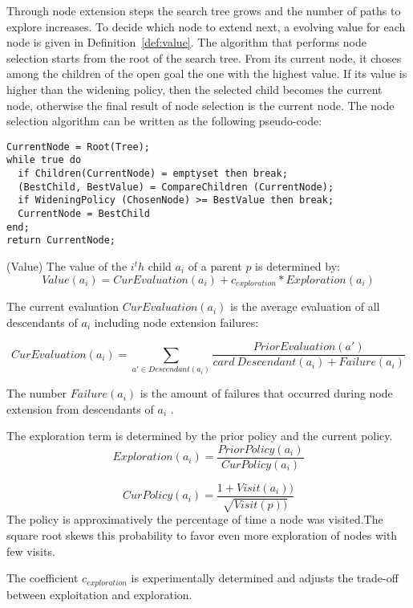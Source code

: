 \documentclass[runningheads,a4paper,draft]{svjour3}
\begin{document}
Through node extension steps the search tree grows and the number of paths to
explore increases. To decide which node to extend next, a evolving value for
each node is given in Definition~\ref{def:value}. The algorithm that performs
node selection starts from the root of the search tree. From its current node,
it choses among the children of the open goal the one with the highest value. 
If its value is higher than the widening policy, then the selected child 
becomes the current node, otherwise the final result of node selection is the 
current node. The node selection algorithm can be written as the following 
pseudo-code:

\begin{lstlisting}[language=SMLSmall]
CurrentNode = Root(Tree);
while true do
  if Children(CurrentNode) = emptyset then break;
  (BestChild, BestValue) = CompareChildren (CurrentNode);
  if WideningPolicy (ChosenNode) >= BestValue then break;
  CurrentNode = BestChild
end;
return CurrentNode;
\end{lstlisting}

\begin{definition}\label{def:value}(Value)
The value of the $i^th$ child $a_i$ of a parent $p$ is determined by:
\[\mathit{Value}(a_i) = \mathit{CurEvaluation}(a_i) + c_{exploration} * \mathit{Exploration}(a_i)\]

The current evaluation $CurEvaluation(a_i)$ is the average evaluation of
all descendants of $a_i$ including node extension
failures:

\[\mathit{CurEvaluation}(a_i) =
  \sum_{a' \in Descendant(a_i)} \frac{\mathit{PriorEvaluation}(a')} {card\
  \mathit{Descendant}(a_i) + \mathit{Failure}(a_i)}\]

The number $\mathit{Failure}(a_i)$ is the amount of failures that occurred during node
extension from descendants of $a_i$ .

The exploration term is determined by the prior policy and the current policy.
\[\mathit{Exploration}(a_i) = \frac{\mathit{PriorPolicy}(a_i)}{\mathit{CurPolicy}(a_i)}\]

\[\mathit{CurPolicy}(a_i) = \frac{1 + \mathit{Visit}(a_i))}{\sqrt{\mathit{Visit}(p))}}\]
The policy is approximatively the  percentage of time a node was visited.The
square root skews this probability to favor even more exploration of nodes with
few visits.

The coefficient $c_{exploration}$ is experimentally determined and adjusts the
trade-off between exploitation and exploration.
\end{definition}
\end{document}
